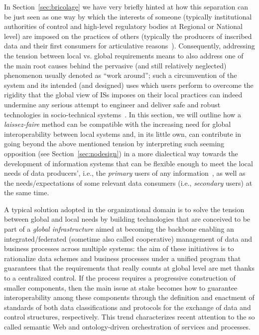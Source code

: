 \documentclass{article}
\begin{document}
In Section~\ref{sec:bricolage} we have very briefly hinted at how this separation can be just seen as one way by which the interests of someone (typically institutional authorities of control and high-level regulatory bodies at Regional or National level) are imposed on the practices of others (typically the producers of inscribed data and their first consumers for articulative reasons~\citep{berg_accumulating_1999,winthereik_ict_2005,cabitza_whatever_2012}). Consequently, addressing the tension between local vs. global requirements means to also address one of the main root causes behind the pervasive (and still relatively neglected) phenomenon usually denoted as ``work around''; such a circumvention of the system and its intended (and designed) uses which users perform to overcome the rigidity that the global view of ISs imposes on their local practices can indeed undermine any serious attempt to engineer and deliver safe and robust technologies in socio-technical systems~\citep{niazkhani_evaluating_2011,handel_working_2011}. In this section, we will outline how a \emph{laissez-faire} method can be compatible with the increasing need for global interoperability between local systems and, in its little own, can contribute in going beyond the above mentioned tension by interpreting such seeming opposition (see Section~\ref{sec:nodesign}) in a more dialectical way towards the development of information systems that can be flexible enough to meet the local needs of data producers', i.e., the \emph{primary} users of any information~\citep{cabitza_whatever_2012}, as well as the needs/expectations of some relevant data consumers (i.e., \emph{secondary} users) at the same time.

A typical solution adopted in the organizational domain is to solve the tension between global and local needs by building technologies that are conceived to be part of a \emph{global infrastructure} aimed at becoming the backbone enabling an integrated/federated (sometime also called cooperative) management of data and business processes across multiple systems: the aim of these initiatives is to rationalize data schemes and business processes under a unified program that guarantees that the requirements that really counts at global level are met thanks to a centralized control. If the process requires a progressive construction of smaller components, then the main issue at stake becomes how to guarantee interoperability among these components through the definition and enactment of standards of both data classifications and protocols for the exchange of data and control structures, respectively. This trend characterizes recent attention to the so called semantic Web and ontology-driven orchestration of services and processes.
\end{document}
